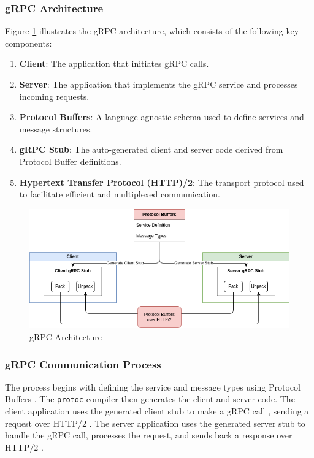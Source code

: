 \subsubsection{gRPC Architecture}

Figure \ref{fig:grpc} illustrates the gRPC architecture, which consists of the following key components:
\begin{enumerate}
    \item \textbf{Client}: The application that initiates gRPC calls.
    \item \textbf{Server}: The application that implements the gRPC service and processes incoming requests.
    \item \textbf{Protocol Buffers}: A language-agnostic schema used to define services and message structures.
    \item \textbf{gRPC Stub}: The auto-generated client and server code derived from Protocol Buffer definitions.
    \item \textbf{Hypertext Transfer Protocol (HTTP)/2}: The transport protocol used to facilitate efficient and multiplexed communication.
\end{enumerate}

\begin{figure}[H]
    \centering
    \includegraphics[width=\textwidth]{figures/gRPC_architecture.drawio.png}
    \caption{gRPC Architecture}
    \label{fig:grpc}
\end{figure}

\subsubsection{gRPC Communication Process}
The process begins with defining the service and message types using Protocol Buffers \cite{protocol_buffers_overview}. The \texttt{protoc} compiler then generates the client and server code. The client application uses the generated client stub to make a gRPC call \cite{grpc_api}, sending a request over HTTP/2 \cite{grpc_http2}. The server application uses the generated server stub to handle the gRPC call, processes the request, and sends back a response  over HTTP/2 \cite{grpc_api}.


